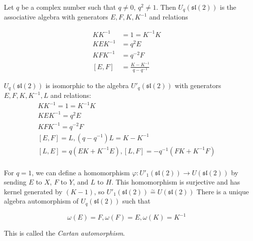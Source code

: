 \documentclass[]{article}
\begin{document}
Let $q$ be a complex number such that $q \neq 0$, $q^2 \neq 1$.  Then $U_q(\mathfrak{sl}(2))$ is the associative algebra with generators $E,F,K, K^{-1}$ and relations 

\begin{align}
    KK^{-1} &= 1 = K^{-1}K \\
    KEK^{-1} &= q^2 E \\
    KFK^{-1} &= q^{-2} F \\
    [E,F] &= \frac{K - K^{-1}}{q - q^{-1}}
\end{align}


$U_q(\mathfrak{sl}(2))$ is isomorphic to the algebra $U'_q(\mathfrak{sl}(2))$ with generators $E,F,K,K^{-1},L$ and relations:
\begin{equation}
    \begin{gathered}
    KK^{-1} = 1 = K^{-1}K \\
    KEK^{-1} = q^2 E \\
    KFK^{-1} = q^{-2} F \\
    [E,F] = L, (q - q^{-1})L = K-K^{-1} \\
    [L,E] = q(EK + K^{-1}E), [L,F] = -q^{-1}(FK + K^{-1}F) \\
    \end{gathered}
\end{equation}



For $q=1$, we can define a homomorphism $\varphi: U'_1(\mathfrak{sl}(2)) \to
U(\mathfrak{sl}(2))$ by sending $E$ to $X$, $F$ to $Y$, and $L$ to $H$. This
homomorphism is surjective and has kernel generated by $(K-1)$, so
$U'_1(\mathfrak{sl}(2)) \stackrel{\sim}{=} U(\mathfrak{sl}(2))$
There is a unique algebra automorphism of $U_q(\mathfrak{sl}(2))$ such that 

\begin{equation}
    \omega(E) = F, \omega(F) = E, \omega(K) = K^{-1}
\end{equation}

This is called the \emph{Cartan automorphism}.
\end{document}

